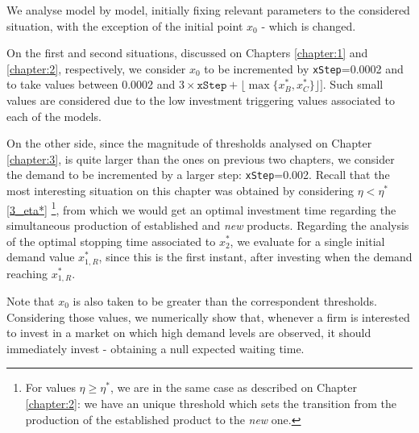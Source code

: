 We analyse model by model, initially fixing relevant parameters to the considered situation, with the exception of the initial point $x_0$ - which is changed.

On the first and second situations, discussed on Chapters \ref{chapter:1} and \ref{chapter:2}, respectively, we consider $x_0$ to be incremented by \texttt{xStep}=0.0002 and to take values between 0.0002 and $3 \times  \texttt{xStep} + \lfloor \max{ \{ x_B^*, x_C^* \} } \rfloor]$. Such small values are considered due to the low investment triggering values associated to each of the models.


On the other side, since the magnitude of thresholds analysed on Chapter \ref{chapter:3}, is quite larger than the ones on previous two chapters, we consider the demand to be incremented by a larger step: \texttt{xStep}=0.002.
Recall that the most interesting situation on this chapter was obtained by considering $\eta<\eta^*$ \eqref{3_eta*} \footnote{For values $\eta \geq \eta^*$, we are in the same case as described on Chapter \ref{chapter:2}: we have an unique threshold which sets the transition from the production of the established product to the \textit{new} one.}, from which we would get an optimal investment time regarding the simultaneous production of established and \textit{new} products. Regarding the analysis of the optimal stopping time associated to $x_2^*$, we evaluate for a single initial demand value $x_{1,R}^*$, since this is the first instant, after investing when the demand reaching $x_{1,R}^*$.




Note that $x_0$ is also taken to be greater than the correspondent thresholds. Considering those values, we numerically show that, whenever a firm is interested to invest in a market on which high demand levels are observed, it should immediately invest - obtaining a null expected waiting time.

		

